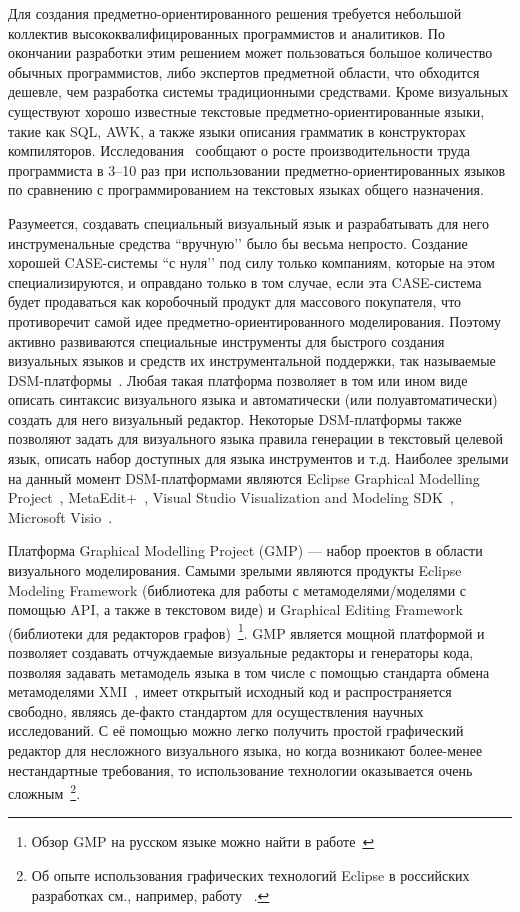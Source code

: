 \documentclass[a4paper]{article}
\begin{document}
Для создания предметно-ориентированного решения  требуется небольшой коллектив высококвалифицированных программистов и аналитиков. По окончании разработки этим решением может пользоваться большое количество обычных программистов, либо экспертов предметной области, что обходится дешевле, чем разработка системы традиционными средствами. Кроме визуальных существуют хорошо известные текстовые предметно-ориентированные языки, такие как SQL, AWK, а также языки описания грамматик в конструкторах компиляторов. Исследования~\cite{kelly, kieburtz, weiss} сообщают о росте производительности труда программиста в 3--10 раз при использовании предметно-ориентированных языков по сравнению с программированием на текстовых языках общего назначения.

Разумеется, создавать специальный визуальный язык и разрабатывать для него инструменальные средства ``вручную’’ было бы весьма непросто. Создание хорошей CASE-системы ``с нуля’’ под силу только компаниям, которые на этом специализируются, и оправдано только в том случае, если эта CASE-система будет продаваться как коробочный продукт для массового покупателя, что противоречит самой идее предметно-ориентированного моделирования. Поэтому активно развиваются специальные инструменты для быстрого создания визуальных языков и средств их инструментальной поддержки, так называемые DSM-платформы~\cite{dsmPlatforms}. Любая такая платформа позволяет в том или ином виде описать синтаксис визуального языка и автоматически (или полуавтоматически) создать для него визуальный редактор. Некоторые DSM-платформы также позволяют задать для визуального языка правила генерации в текстовый целевой язык, описать набор доступных для языка инструментов и т.д. Наиболее зрелыми на данный момент DSM-платформами являются Eclipse Graphical Modelling Project~\cite{gmp, sorKoz}, MetaEdit+~\cite{metaEditPlus}, Visual Studio Visualization and Modeling SDK~\cite{vsvmsdk}, Microsoft Visio~\cite{visio}. 

Платформа Graphical Modelling Project (GMP) --- набор проектов в области визуального моделирования. Самыми зрелыми являются продукты Eclipse Modeling Framework (библиотека для работы с метамоделями/моделями с помощью API, а также в текстовом виде) и Graphical Editing Framework (библиотеки для редакторов графов)~\footnote{Обзор GMP на русском языке можно  найти в работе~\cite{sorKoz}}. GMP является мощной платформой и  позволяет создавать отчуждаемые визуальные редакторы и генераторы кода, позволяя задавать метамодель языка в том числе с помощью стандарта обмена метамоделями XMI~\cite{xmi}, имеет открытый исходный код и распространяется свободно, являясь де-факто стандартом для осуществления научных исследований. С её помощью можно легко получить простой графический редактор для несложного визуального языка, но когда возникают более-менее нестандартные требования, то использование технологии оказывается очень сложным~\footnote{Об опыте использования графических технологий Eclipse в российских разработках см., например, работу ~\cite{shalitoEcl}.}. 
\end{document}
